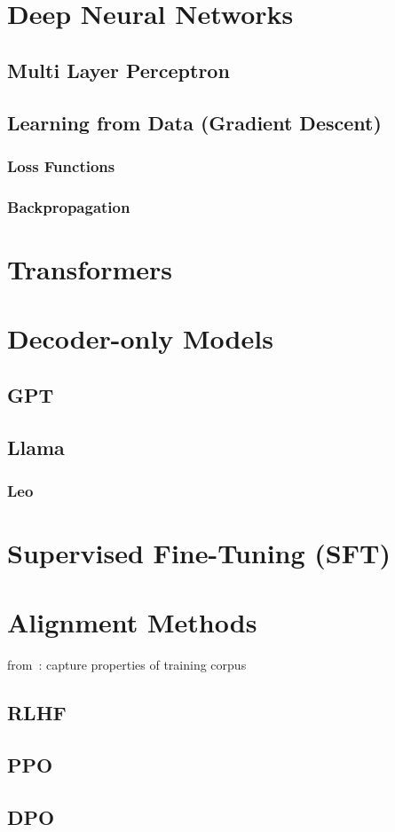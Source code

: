 \section{Deep Neural Networks}\label{sec:dnn}

\subsection{Multi Layer Perceptron}\label{subsec:multi-layer-perceptron}

\subsection{Learning from Data (Gradient Descent)}\label{subsec:learning-from-data}

\subsubsection{Loss Functions}

\subsubsection{Backpropagation}

\section{Transformers}\label{sec:trans}

\section{Decoder-only Models}\label{sec:decoder}

\subsection{GPT}\label{subsec:gpt}

\subsection{Llama}\label{subsec:llama}

\subsubsection{Leo}

\section{Supervised Fine-Tuning (SFT)}\label{sec:supervised-fine-tuning}

\section{Alignment Methods}\label{sec:alignment-methods}
from~\autocite{zhao2023survey}:
capture properties of training corpus

\subsection{RLHF}\label{subsec:rlhf}
\subsection{PPO}\label{subsec:ppo}
\subsection{DPO}\label{subsec:dpo}
